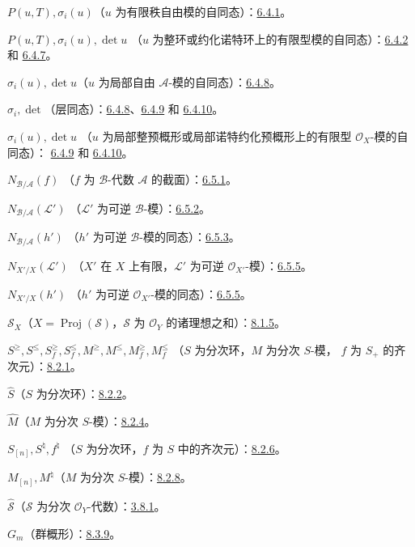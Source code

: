 \documentclass[UTF8,fontset=none,11pt,oneside,openany]{ctexbook}
\providecommand{\Proj}{\operatorname{Proj}}
\begin{document}
$P(u,T),\sigma_i(u)$（$u$ 为有限秩自由模的自同态）：\hyperref[II.6.4.1-zh]{6.4.1}。

$P(u,T),\sigma_i(u),\det u$
（$u$ 为整环或约化诺特环上的有限型模的自同态）：\hyperref[II.6.4.2-zh]{6.4.2} 和 \hyperref[II.6.4.7-zh]{6.4.7}。

$\sigma_i(u),\det u$（$u$ 为局部自由 $\mathcal{A}$-模的自同态）：\hyperref[II.6.4.8-zh]{6.4.8}。

$\sigma_i,\det$（层同态）：\hyperref[II.6.4.8-zh]{6.4.8}、\hyperref[II.6.4.9-zh]{6.4.9} 和 \hyperref[II.6.4.10-zh]{6.4.10}。

$\sigma_i(u),\det u$
（$u$ 为局部整预概形或局部诺特约化预概形上的有限型
$\mathcal{O}_X$-模的自同态）：
\hyperref[II.6.4.9-zh]{6.4.9} 和 \hyperref[II.6.4.10-zh]{6.4.10}。

$N_{\mathcal{B}/\mathcal{A}}(f)$
（$f$ 为 $\mathcal{B}$-代数 $\mathcal{A}$ 的截面）：\hyperref[II.6.5.1-zh]{6.5.1}。

$N_{\mathcal{B}/\mathcal{A}}(\mathcal{L}')$
（$\mathcal{L}'$ 为可逆 $\mathcal{B}$-模）：\hyperref[II.6.5.2-zh]{6.5.2}。

$N_{\mathcal{B}/\mathcal{A}}(h')$
（$h'$ 为可逆 $\mathcal{B}$-模的同态）：\hyperref[II.6.5.3-zh]{6.5.3}。

$N_{X'/X}(\mathcal{L}')$
（$X'$ 在 $X$ 上有限，$\mathcal{L}'$ 为可逆 $\mathcal{O}_{X'}$-模）：\hyperref[II.6.5.5-zh]{6.5.5}。

$N_{X'/X}(h')$
（$h'$ 为可逆 $\mathcal{O}_{X'}$-模的同态）：\hyperref[II.6.5.5-zh]{6.5.5}。

$\mathcal{S}_X$（$X=\Proj(\mathcal{S})$，$\mathcal{S}$ 为
$\mathcal{O}_Y$ 的诸理想之和）：\hyperref[II.8.1.5-zh]{8.1.5}。

$S^\geq,S^\leq,S_f^\geq,S_f^\leq,
M^\geq,M^\leq,M_f^\geq,M_f^\leq$
（$S$ 为分次环，$M$ 为分次 $S$-模，
$f$ 为 $S_+$ 的齐次元）：\hyperref[II.8.2.1-zh]{8.2.1}。

$\widehat S$（$S$ 为分次环）：\hyperref[II.8.2.2-zh]{8.2.2}。

$\widehat M$（$M$ 为分次 $S$-模）：\hyperref[II.8.2.4-zh]{8.2.4}。

$S_{[n]},S^\natural,f^\natural$
（$S$ 为分次环，$f$ 为 $S$ 中的齐次元）：\hyperref[II.8.2.6-zh]{8.2.6}。

$M_{[n]},M^\natural$（$M$ 为分次 $S$-模）：\hyperref[II.8.2.8-zh]{8.2.8}。

$\widehat{\mathcal{S}}$（$\mathcal{S}$ 为分次 $\mathcal{O}_Y$-代数）：\hyperref[II.8.3.1-zh]{3.8.1}。

$G_m$（群概形）：\hyperref[II.8.3.9-zh]{8.3.9}。
\end{document}

